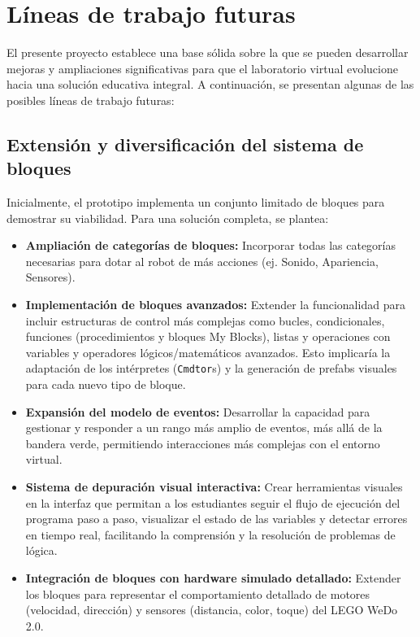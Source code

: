 \section{Líneas de trabajo futuras}

El presente proyecto establece una base sólida sobre la que se pueden desarrollar mejoras y ampliaciones significativas para que el laboratorio virtual evolucione hacia una solución educativa integral. A continuación, se presentan algunas de las posibles líneas de trabajo futuras:

\subsection{Extensión y diversificación del sistema de bloques}
Inicialmente, el prototipo implementa un conjunto limitado de bloques para demostrar su viabilidad. Para una solución completa, se plantea:
\begin{itemize}
	\item \textbf{Ampliación de categorías de bloques:} Incorporar todas las categorías necesarias para dotar al robot de más acciones (ej. Sonido, Apariencia, Sensores).
	\item \textbf{Implementación de bloques avanzados:} Extender la funcionalidad para incluir estructuras de control más complejas como bucles, condicionales, funciones (procedimientos y bloques My Blocks), listas y operaciones con variables y operadores lógicos/matemáticos avanzados. Esto implicaría la adaptación de los intérpretes (\texttt{Cmdtor}s) y la generación de prefabs visuales para cada nuevo tipo de bloque.
	\item \textbf{Expansión del modelo de eventos:} Desarrollar la capacidad para gestionar y responder a un rango más amplio de eventos, más allá de la bandera verde, permitiendo interacciones más complejas con el entorno virtual.
	\item \textbf{Sistema de depuración visual interactiva:} Crear herramientas visuales en la interfaz que permitan a los estudiantes seguir el flujo de ejecución del programa paso a paso, visualizar el estado de las variables y detectar errores en tiempo real, facilitando la comprensión y la resolución de problemas de lógica.
	\item \textbf{Integración de bloques con hardware simulado detallado:} Extender los bloques para representar el comportamiento detallado de motores (velocidad, dirección) y sensores (distancia, color, toque) del LEGO WeDo 2.0.
\end{itemize}

